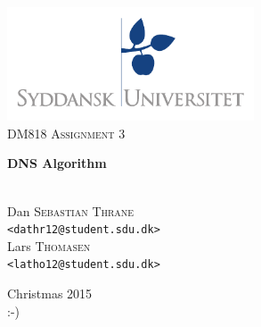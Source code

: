 \documentclass[a4paper,11pt,oneside]{book}
\title{}
\author{}
\date{}
\begin{document}
\begin{titlepage}
\begin{center}

\thispagestyle{empty}
\includegraphics[width=0.55\textwidth]{logo.pdf}\\[1cm]    
\textsc{\Large DM818 Assignment 3}\\[0.5cm]

\begin{Huge}
\textbf{DNS Algorithm}
\end{Huge}

\vspace{4cm}

\begin{minipage}{1\textwidth}
\begin{center}
\emph{}\\

Dan \textsc{Sebastian Thrane}\\
\verb!<dathr12@student.sdu.dk>!\\

Lars \textsc{Thomasen}\\
\verb!<latho12@student.sdu.dk>!\\

\end{center}
\end{minipage}
\begin{minipage}{0.4\textwidth}
\end{minipage}

\vfill
{\large Christmas 2015}\\ :-)

\end{center}
\end{titlepage}

\renewcommand{\contentsname}{Table of Contents}
\tableofcontents
\thispagestyle{empty}
\end{document}
